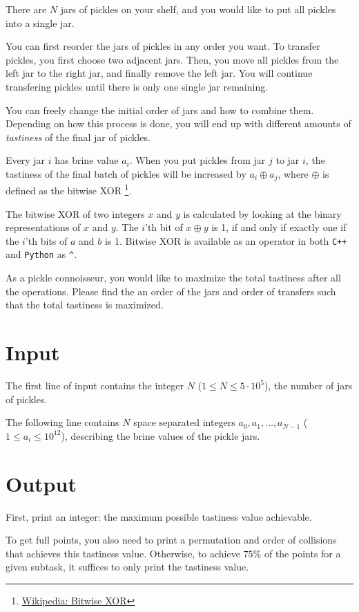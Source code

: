 \noindent

There are $N$ jars of pickles on your shelf, and you would like to put all pickles into a single jar.

You can first reorder the jars of pickles in any order you want. To transfer pickles, you first choose two
adjacent jars. Then, you move all pickles from the left jar to the right jar, and finally remove the left jar.
You will continue transfering pickles until there is only one single jar remaining.

You can freely change the initial order of jars and how to combine them. Depending on how this process is done,
you will end up with different amounts of \textit{tastiness} of the final jar of pickles.

Every jar $i$ has brine value $a_i$. When you put pickles from jar $j$ to jar $i$, the tastiness of the final batch
of pickles will be increased by
$a_i \oplus a_j$, where $\oplus$ is defined as the bitwise XOR
\footnote{\href{https://en.wikipedia.org/wiki/Exclusive_or}{Wikipedia: Bitwise XOR}}.

The bitwise XOR of two integers $x$ and $y$ is calculated by looking at the binary representations of $x$ and $y$. 
The $i$'th bit of $x \oplus y$ is 1, if and only if exactly one if the $i$'th bits of $a$ and $b$ is 1. Bitwise XOR is
available as an operator in both \texttt{C++} and \texttt{Python} as \verb|^|.

As a pickle connoisseur, you would like to maximize the total tastiness after all the operations.
Please find the an order of the jars and order of transfers such that the total tastiness is maximized. 


\section*{Input}
The first line of input contains the integer $N$ ($1 \leq N \leq 5 \cdot 10^5$), the number of jars of pickles.

The following line contains $N$ space separated integers $a_0, a_1, \dots, a_{N-1}$ ($1 \leq a_i \leq 10^{12}$),
describing the brine values of the pickle jars.

\section*{Output}
\noindent
First, print an integer: the maximum possible tastiness value achievable.

To get full points, you also need to print a permutation and order of collisions that achieves this tastiness value.
Otherwise, to achieve $75\%$ of the points for a given subtask, it suffices to only print the tastiness value.

